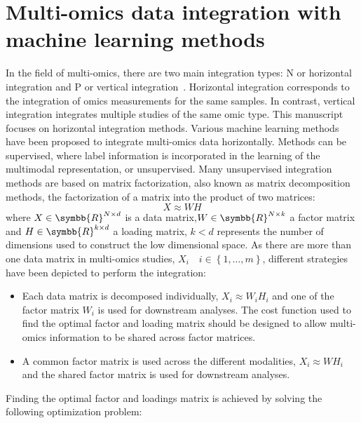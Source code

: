 \documentclass[../main.tex]{subfiles}
\begin{document}


\section[Multi-omics integration with ML]{Multi-omics data integration with machine learning methods}
	In the field of multi-omics, there are two main integration types: N or horizontal integration and P or vertical integration~\cite{Tseng2012}.
	Horizontal integration corresponds to the integration of omics measurements for the same samples.
	In contrast, vertical integration integrates multiple studies of the same omic type.
	This manuscript focuses on horizontal integration methods.
	Various machine learning methods have been proposed to integrate multi-omics data horizontally.
	Methods can be supervised, where label information is incorporated in the learning of the multimodal representation, or unsupervised.
	Many unsupervised integration methods are based on matrix factorization, also known as matrix decomposition methods, the factorization of a matrix into the product of two matrices:
	\begin{equation}
	    X \approx WH
	\end{equation}
	where \(X \in \symbb{R}^{N\times d}\) is a data matrix,\(W \in \symbb{R}^{N\times k}\) a factor matrix and \(H \in \symbb{R}^{k\times d}\) a loading matrix, \(k < d\) represents the number of dimensions used to construct the low dimensional space.
	As there are more than one data matrix in multi-omics studies, \(X_i\quad i \in \left\{1, \ldots, m\right\}\), different strategies have been depicted to perform the integration:
	\begin{itemize}[nosep]
	    \item Each data matrix is decomposed individually, \(X_i \approx W_i H_i\) and one of the factor matrix \(W_i\) is used for downstream analyses. The cost function used to find the optimal factor and loading matrix should be designed to allow multi-omics information to be shared across factor matrices.
	    \item A common factor matrix is used across the different modalities, \(X_i \approx WH_i\) and the shared factor matrix is used for downstream analyses.
	\end{itemize}
	Finding the optimal factor and loadings matrix is achieved by solving the following optimization problem:
\end{document}

